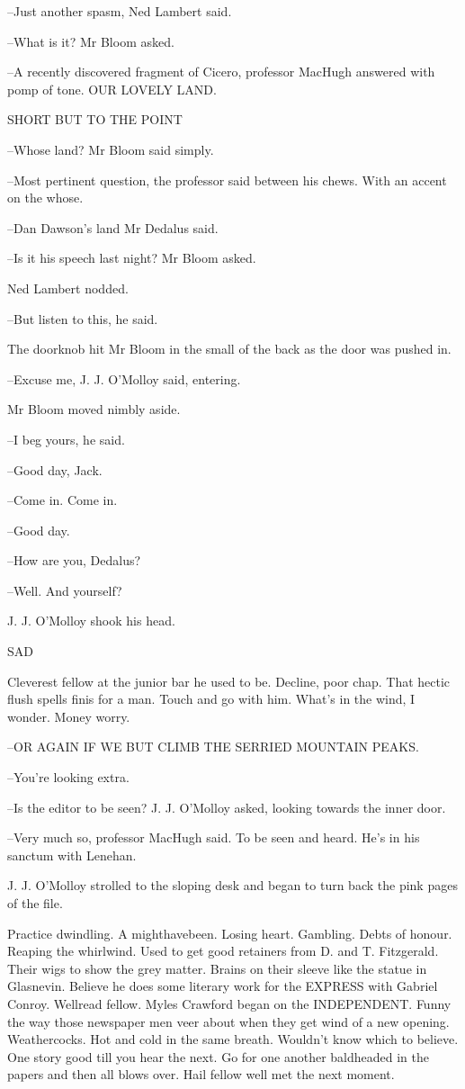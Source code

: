 --Just another spasm, Ned Lambert said.

--What is it? Mr Bloom asked.

--A recently discovered fragment of Cicero, professor MacHugh answered
with pomp of tone. OUR LOVELY LAND.


    SHORT BUT TO THE POINT


--Whose land? Mr Bloom said simply.

--Most pertinent question, the professor said between his chews. With an
accent on the whose.

--Dan Dawson's land Mr Dedalus said.

--Is it his speech last night? Mr Bloom asked.

Ned Lambert nodded.

--But listen to this, he said.

The doorknob hit Mr Bloom in the small of the back as the door was
pushed in.

--Excuse me, J. J. O'Molloy said, entering.

Mr Bloom moved nimbly aside.

--I beg yours, he said.

--Good day, Jack.

--Come in. Come in.

--Good day.

--How are you, Dedalus?

--Well. And yourself?

J. J. O'Molloy shook his head.


    SAD


Cleverest fellow at the junior bar he used to be. Decline, poor chap.
That hectic flush spells finis for a man. Touch and go with him. What's in
the wind, I wonder. Money worry.

--OR AGAIN IF WE BUT CLIMB THE SERRIED MOUNTAIN PEAKS.

--You're looking extra.

--Is the editor to be seen? J. J. O'Molloy asked, looking towards the
inner door.

--Very much so, professor MacHugh said. To be seen and heard. He's in
his sanctum with Lenehan.

J. J. O'Molloy strolled to the sloping desk and began to turn back the
pink pages of the file.

Practice dwindling. A mighthavebeen. Losing heart. Gambling. Debts
of honour. Reaping the whirlwind. Used to get good retainers from D. and
T. Fitzgerald. Their wigs to show the grey matter. Brains on their sleeve
like the statue in Glasnevin. Believe he does some literary work for the
EXPRESS with Gabriel Conroy. Wellread fellow. Myles Crawford began on
the INDEPENDENT. Funny the way those newspaper men veer about when
they get wind of a new opening. Weathercocks. Hot and cold in the same
breath. Wouldn't know which to believe. One story good till you hear the
next. Go for one another baldheaded in the papers and then all blows over.
Hail fellow well met the next moment.

